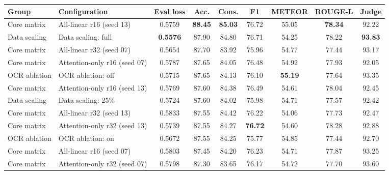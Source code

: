 \begin{tabular}{llccccccc}
\toprule
Group & Configuration & Eval loss & Acc. & Cons. & F1 & METEOR & ROUGE-L & Judge\\
\midrule
Core matrix & All-linear r16 (seed 13) & 0.5759 & \textbf{88.45} & \textbf{85.03} & 76.72 & 55.05 & \textbf{78.34} & 92.22\\
Data scaling & Data scaling: full & \textbf{0.5576} & 87.90 & 84.80 & 76.71 & 54.25 & 78.22 & \textbf{93.83}\\
Core matrix & All-linear r32 (seed 07) & 0.5654 & 87.70 & 83.92 & 75.96 & 54.77 & 77.44 & 93.17\\
Core matrix & Attention-only r16 (seed 07) & 0.5787 & 87.65 & 84.05 & 76.48 & 54.92 & 77.93 & 92.05\\
OCR ablation & OCR ablation: off & 0.5715 & 87.65 & 84.13 & 76.10 & \textbf{55.19} & 77.64 & 93.35\\
Core matrix & Attention-only r16 (seed 13) & 0.5769 & 87.60 & 84.38 & 76.49 & 54.61 & 78.04 & 92.45\\
Data scaling & Data scaling: 25\% & 0.5724 & 87.60 & 84.02 & 75.98 & 54.71 & 77.57 & 92.42\\
Core matrix & All-linear r32 (seed 13) & 0.5833 & 87.55 & 84.42 & 76.22 & 54.06 & 77.73 & 92.47\\
Core matrix & Attention-only r32 (seed 13) & 0.5739 & 87.55 & 84.27 & \textbf{76.72} & 54.60 & 78.28 & 92.88\\
OCR ablation & OCR ablation: on & 0.5672 & 87.55 & 84.25 & 75.77 & 54.85 & 77.44 & 92.70\\
Core matrix & All-linear r16 (seed 07) & 0.5803 & 87.45 & 84.20 & 76.23 & 54.71 & 77.87 & 93.25\\
Core matrix & Attention-only r32 (seed 07) & 0.5798 & 87.30 & 83.65 & 76.17 & 54.72 & 77.70 & 93.60\\
\bottomrule
\end{tabular}
